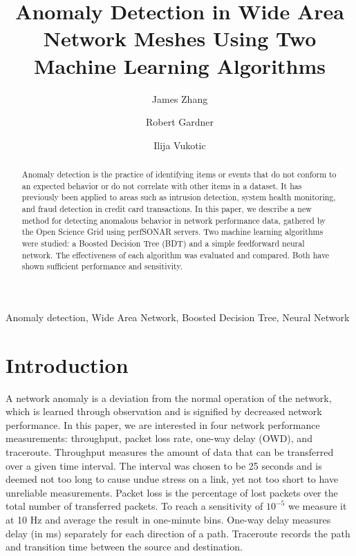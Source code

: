 \documentclass[5p]{elsarticle}
\begin{document}
\begin{frontmatter}

\title{Anomaly Detection in Wide Area Network Meshes Using Two Machine Learning Algorithms}

\author{James Zhang}
\author{Robert Gardner}
\author{Ilija Vukotic}
\address{University of Chicago, Physics Research Center, 933 East 56$^{th}$ St., Chicago, IL, 60637 USA}



\begin{abstract}
Anomaly detection is the practice of identifying items or events that do not conform to an expected behavior or do not correlate with other items in a dataset. It has previously been applied to areas such as intrusion detection, system health monitoring, and fraud detection in credit card transactions. In this paper, we describe a new method for detecting anomalous behavior in network performance data, gathered by the Open Science Grid using perfSONAR servers.  Two machine learning algorithms were studied: a Boosted Decision Tree (BDT) and a simple feedforward neural network. The effectiveness of each algorithm was evaluated and compared. Both have shown sufficient performance and sensitivity.
\end{abstract}

\begin{keyword}
Anomaly detection, Wide Area Network, Boosted Decision Tree, Neural Network
\end{keyword}

\end{frontmatter}



\section{Introduction}

A network anomaly is a deviation from the normal operation of the network, which is learned through observation and is signified by decreased network performance. In this paper, we are interested in four network performance measurements: throughput, packet loss rate, one-way delay (OWD), and traceroute. Throughput measures the amount of data that can be transferred over a given time interval. The interval was chosen to be 25 seconds and is deemed not too long to cause undue stress on a link, yet not too short to have unreliable measurements. Packet loss is the percentage of lost packets over the total number of transferred packets. To reach a sensitivity of $10^{-5}$ we measure it at 10 Hz and average the result in one-minute bins. One-way delay measures delay (in ms) separately for each direction of a path. Traceroute records the path and transition time between the source and destination.
\end{document}

